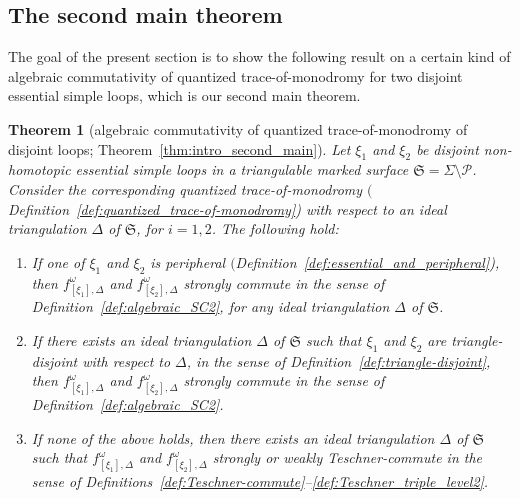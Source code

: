 \documentclass[10pt,a4paper]{amsart}
\numberwithin{equation}{section}
\newtheorem{Theorem}{Theorem}[section]
\theoremstyle{definition}
\begin{document}
\subsection{The second main theorem}
The goal of the present section is to show the following result on a certain kind of algebraic commutativity of quantized trace-of-monodromy for two disjoint essential simple loops, which is our second main theorem.
\begin{Theorem}[algebraic commutativity of quantized trace-of-monodromy of disjoint loops; Theorem~\ref{thm:intro_second_main}]
\label{thm:algebraic_commutativity}
Let $\xi_1$ and $\xi_2$ be disjoint non-homotopic essential simple loops in a triangulable marked surface $\mathfrak{S} = \Sigma\setminus \mathcal{P}$. Consider the corresponding quantized trace-of-monodromy  $($Definition~{\rm \ref{def:quantized_trace-of-monodromy})} with respect to an ideal triangulation $\Delta$ of $\mathfrak{S}$, for $i=1,2$. The following hold:
\begin{enumerate}[label={\rm (AC\arabic*)}]\itemsep=-0.1pt\setlength{\leftskip}{0.25cm}
\item\label{AC1} If one of $\xi_1$ and $\xi_2$ is peripheral $($Definition~{\rm \ref{def:essential_and_peripheral})}, then $f^\omega_{[\xi_1],\Delta}$ and $f^\omega_{[\xi_2],\Delta}$ strongly commute in the sense of Definition~{\rm \ref{def:algebraic_SC2}}, for any ideal triangulation $\Delta$ of $\mathfrak{S}$.
\item\label{AC2} If there exists an ideal triangulation $\Delta$ of $\mathfrak{S}$ such that $\xi_1$ and $\xi_2$ are triangle-disjoint with respect to $\Delta$, in the sense of Definition~{\rm \ref{def:triangle-disjoint}}, then $f^\omega_{[\xi_1],\Delta}$ and $f^\omega_{[\xi_2],\Delta}$ strongly commute in the sense of Definition~{\rm \ref{def:algebraic_SC2}}.
\item\label{AC3} If none of the above holds, then there exists an ideal triangulation $\Delta$ of $\mathfrak{S}$ such that $f^\omega_{[\xi_1],\Delta}$ and $f^\omega_{[\xi_2],\Delta}$ strongly or weakly Teschner-commute in the sense of Definitions~{\rm \ref{def:Teschner-commute}--\ref{def:Teschner_triple_level2}}.
\end{enumerate}
\end{Theorem}
\end{document}
